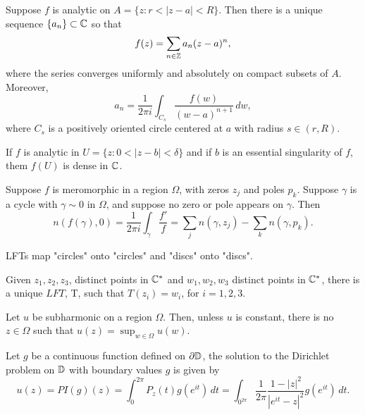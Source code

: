 \documentclass[12pt]{article}
\begin{document}
\begin{sats}[Laurent]
    Suppose $f$ is analytic on $A=\{z:r<|z-a|<R\}$. Then there is a unique sequence $\{a_n\}\subset\mathbb{C}$ so that
    \begin{equation*}
        f(z)=\sum_{n\in\mathbb{Z}} a_n(z-a)^n,
    \end{equation*}
    where the series converges uniformly and absolutely on compact subsets of $A$. Moreover, 
    \begin{equation*}
        a_n=\frac{1}{2\pi i}\int_{C_s} \frac{f(w)}{(w-a)^{n+1}}\,dw,
    \end{equation*}
    where $C_s$ is a positively oriented circle centered at $a$ with radius $s\in(r,R)$.
\end{sats}

\begin{sats}
    If $f$ is analytic in $U=\{z:0<|z-b|<\delta\}$ and if $b$ is an essential singularity of $f$, them $f(U)$ is dense in $\mathbb{C}$.
\end{sats}

\begin{sats}
    Suppose $f$ is meromorphic in a region $\Omega$, with zeros $z_j$ and poles $p_k$. Suppose $\gamma$ is a cycle with $\gamma\sim 0$ in $\Omega$, and suppose no zero or pole appears on $\gamma$. Then
    \begin{equation*}
        n(f(\gamma),0)=\frac{1}{2\pi i}\int_\gamma\frac{f'}{f} = \sum_j n(\gamma,z_j)-\sum_k n(\gamma,p_k).
    \end{equation*}
\end{sats}

\begin{sats}
    LFTs map "circles" onto "circles" and "discs" onto "discs".
\end{sats}

\begin{sats}
    Given $z_1,z_2,z_3$, distinct points in $\mathbb{C}^*$ and $w_1,w_2,w_3$ distinct points in $\mathbb{C}^*$, there is a unique $LFT$, T, such that $T(z_i)=w_i$, for $i=1,2,3$.
\end{sats}

\begin{sats}
    Let $u$ be subharmonic on a region $\Omega$. Then, unless $u$ is constant, there is no $z\in\Omega$ such that $u(z)=\sup_{w\in\Omega}u(w)$.
\end{sats}

\begin{sats}
    Let $g$ be a continuous function defined on $\partial\mathbb{D}$, the solution to the Dirichlet problem on $\mathbb{D}$ with boundary values $g$ is given by
    \begin{equation*}
        u(z)=PI(g)(z)=\int_0^{2\pi} P_z(t)g(e^{it})\,dt=\int_{0^{2\pi}}\frac{1}{2\pi}\frac{1-|z|^2}{|e^{it}-z|^2}g(e^{it})\,dt.
    \end{equation*}
\end{sats}
\end{document}
